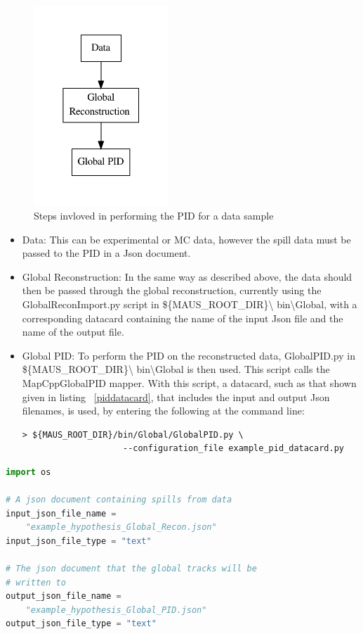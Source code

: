 \begin{figure}[h!]
\begin{center} 
\includegraphics[width=2in]{reconstruction/globalpid/pidperfflow.pdf} 
\caption{Steps invloved in performing the PID for a data sample}
\label{pidperf}
\end{center} 
\end{figure}
			
\begin{itemize}
\item Data: This can be experimental or MC data, however the spill data must be passed to the PID in a Json document.
\item Global Reconstruction: In the same way as described above, the 
data should then be passed through the global reconstruction, 
currently using the GlobalReconImport.py script in \$\{MAUS\_ROOT\_DIR\}\textbackslash 
bin\textbackslash Global, with a corresponding datacard containing the name of the input Json file and the name of the output file.
\item Global PID: To perform the PID on the reconstructed data, GlobalPID.py in \$\{MAUS\_ROOT\_DIR\}\textbackslash 
bin\textbackslash Global is then used. This script calls the 
MapCppGlobalPID mapper. With this script, a datacard, such as that 
shown given in listing ~\ref{piddatacard}, that includes the input and output Json filenames, is used, by entering the following at the command line:
\begin{verbatim}
> ${MAUS_ROOT_DIR}/bin/Global/GlobalPID.py \
                    --configuration_file example_pid_datacard.py
\end{verbatim}
\end{itemize}

\begin{lstlisting}[language=Python,basicstyle=\ttfamily,breaklines=true,frame=single,captionpos=b,caption={An example datacard (example\_pid\_datacard.py) for use with GlobalPID.py},label=piddatacard]
import os

# A json document containing spills from data
input_json_file_name = 
	"example_hypothesis_Global_Recon.json"
input_json_file_type = "text"

# The json document that the global tracks will be
# written to
output_json_file_name = 
	"example_hypothesis_Global_PID.json"
output_json_file_type = "text"
\end{lstlisting}


